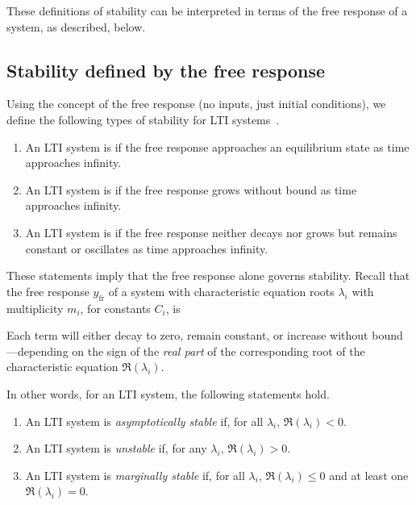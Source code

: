 \documentclass[dynamic_systems.tex]{subfiles}
\begin{document}
These definitions of stability can be interpreted in terms of the free response of a system, as described, below.
\tags{}

\subsection{Stability defined by the free response} 
\tags{}
\label{sec:stabilityfree}


Using the concept of the free response (no inputs, just initial conditions), we define the following types of stability for LTI systems~\cite{Nise2015}.
\tags{}
\begin{enumerate}
	\item An LTI system is  if the free response approaches an equilibrium state as time approaches infinity.
	\item An LTI system is  if the free response grows without bound as time approaches infinity.
	\item An LTI system is  if the free response neither decays nor grows but remains constant or oscillates as time approaches infinity.
\end{enumerate}

These statements imply that the free response alone governs stability.
Recall that the free response $y_\text{fr}$ of a system with characteristic equation roots $\lambda_i$ with multiplicity $m_i$, for constants $C_i$, is
\tags{}

\noindent Each term will either decay to zero, remain constant, or increase without bound---depending on the sign of the \emph{real part} of the corresponding root of the characteristic equation $\Re{(\lambda_i)}$.
\tags{}

In other words, for an LTI system, the following statements hold.
\begin{enumerate}
	\item An LTI system is \emph{asymptotically stable} if, for all $\lambda_i$, $\Re{(\lambda_i)} < 0$.
	\item An LTI system is \emph{unstable} if, for any $\lambda_i$, $\Re{(\lambda_i)} > 0$.
	\item An LTI system is \emph{marginally stable} if, for all $\lambda_i$, $\Re{(\lambda_i)} \le 0$ and at least one $\Re{(\lambda_i)} = 0$.
\end{enumerate}
\end{document}
